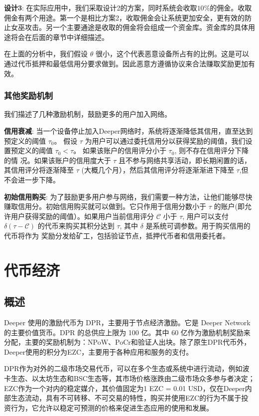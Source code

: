 \documentclass[a4paper]{article}
\begin{document}
\textbf{设计3}: 在实际应用中，我们采取设计2的方案，同时系统会收取$10\%$的佣金。收取佣金有两个用途。第一个是相比方案2，收取佣金会让系统更加安全，更有效的防止女巫攻击。另一个主要通途是收取的佣金将会组成一个资金库。资金库的具体用途将会在后面的章节中详细描述。

在上面的分析中，我们假设 $\theta$ 很小，这个代表恶意设备所占有的比例。这是可以通过代币抵押和最低信用分要求做到。因此恶意方遵循协议来合法赚取奖励更加有效。

\subsubsection{其他奖励机制}
我们描述了几种激励机制，鼓励更多的用户加入网络。

\textbf{信用衰减}: 当一个设备停止加入Deeper网络时，系统将逐渐降低其信用，直至达到预定义的阈值 $\tau_0$。 假设 $\tau$ 为用户可以通过委托信用分以获得奖励的阈值，我们设置预定义的阈值 $\tau_0 < \tau$。 如果该账户的信用评分小于 $\tau_0$, 则不存在信用评分下降的情
况。如果该账户的信用度大于 $\tau$ 且不参与网络共享活动，即长期闲置的话，其信用评分将逐渐降至 $\tau$ (大概几个月），然后其信用评分将逐渐渐进下降至 $\tau$,但不会进一步下降。

\textbf{初始信用购买}: 为了鼓励更多用户参与网络，我们需要一种方法，让他们能够尽快赚取信用分。初始信用购买就可以做到。它只作用于信用分数小于 $\tau$ 的账户(即允许用户获得奖励的阈值）。如果用户当前信用评分 $\mathcal{C}$ 小于 $\tau$, 用户可以支付 $\delta(\tau-\mathcal{C})$ 的代币来购买其积分达到 $\tau$, 其中 $\delta$ 是系统可调参数。用于购买信用的代币将作为 奖励分发给矿工，包括验证节点，抵押代币者和信用委托者。

\newpage
\section{代币经济}
\subsection{概述}
Deeper 使用的激励代币为 DPR，主要用于节点经济激励。它是 Deeper Network 的主要价值货币。DPR 的总供应上限为 100 亿。其中 60 亿作为激励机制奖励来分配，主要的奖励机制为：NPoW、PoCr和验证人出块。除了原生DPR代币外，Deeper使用的积分为EZC，主要用于各种应用和服务的支付。

DPR作为对外的二级市场交易代币，可以在多个生态或系统中进行流动，例如波卡生态、以太坊生态和BSC生态等，其市场价格涨跌由二级市场众多参与者决定；EZC作为一个对内的稳定媒介，其价值固定为1 EZC = 0.01 USD，仅在Deeper内部生态流动，具有不可转移、不可交易的特性，购买并使用EZC的行为不属于投资行为，它允许以稳定可预测的价格来促进生态应用的使用和发展。
\end{document}
